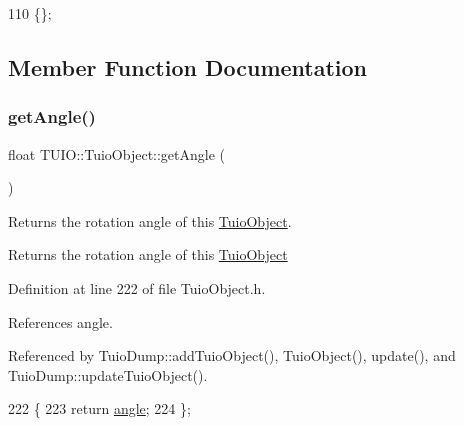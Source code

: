 \begin{DoxyCode}
110 \{\};
\end{DoxyCode}


\subsection{Member Function Documentation}
\mbox{\label{class_t_u_i_o_1_1_tuio_object_a7757d3c07bb7014f50bc645016d58933}} 
\subsubsection{\texorpdfstring{get\+Angle()}{getAngle()}}
{\footnotesize\ttfamily float T\+U\+I\+O\+::\+Tuio\+Object\+::get\+Angle (\begin{DoxyParamCaption}{ }\end{DoxyParamCaption})\hspace{0.3cm}{\ttfamily [inline]}}

Returns the rotation angle of this \hyperlink{class_t_u_i_o_1_1_tuio_object}{Tuio\+Object}. \begin{DoxyReturn}{Returns}
the rotation angle of this \hyperlink{class_t_u_i_o_1_1_tuio_object}{Tuio\+Object} 
\end{DoxyReturn}


Definition at line 222 of file Tuio\+Object.\+h.



References angle.



Referenced by Tuio\+Dump\+::add\+Tuio\+Object(), Tuio\+Object(), update(), and Tuio\+Dump\+::update\+Tuio\+Object().


\begin{DoxyCode}
222                          \{
223             \textcolor{keywordflow}{return} \hyperlink{class_t_u_i_o_1_1_tuio_object_a1c5652a3ee1175156f13777f0d8068ee}{angle};
224         \};
\end{DoxyCode}
\mbox{\label{class_t_u_i_o_1_1_tuio_object_a57986baeb2c669106cafb8c66a7a3cce}} 
